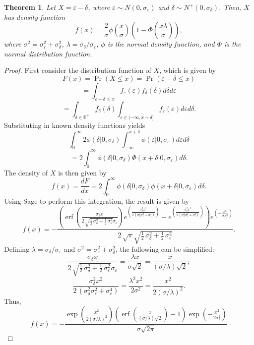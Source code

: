 \documentclass{article}
\newtheorem{theorem}{Theorem}
\newcommand{\ep}{\varepsilon}
\newcommand{\RR}{\mathbb{R}}
\begin{document}
	
\begin{theorem}
	Let $X = \ep - \delta$, where $\ep\sim N(0, \sigma_\ep)$ and $\delta\sim N^+(0, \sigma_\delta)$. Then, $X$ has density function
	$$f(x) = \frac{2}{\sigma}\phi\left(\frac{x}{\sigma}\right)\left(1 - \Phi\left(\frac{x\lambda}{\sigma}\right)\right),$$
	where $\sigma^2 = \sigma_\ep^2 + \sigma_\delta^2$, $\lambda = \sigma_\delta / \sigma_\ep$, $\phi$ is the normal density function, and $\Phi$ is the normal distribution function.
\end{theorem}
\begin{proof}
	First consider the distribution function of $X$, which is given by
	$$F(x) = \Pr(X \leq x) = \Pr(\ep - \delta \leq x)$$
	$$= \int_{\ep - \delta \leq x} f_\ep(\ep) f_\delta(\delta) d\delta d\ep$$
	$$= \int_{\delta\in\RR^+} f_\delta(\delta) \int_{\ep\in (-\infty, x + \delta]} f_\ep(\ep) d\ep d\delta.$$
	Substituting in known density functions yields
	$$\int_0^\infty 2\phi(\delta | 0, \sigma_\delta) \int_{-\infty}^{x + \delta} \phi(\ep | 0, \sigma_\ep) d\ep d\delta$$
	$$= 2\int_0^\infty \phi(\delta | 0, \sigma_\delta) \Phi(x + \delta | 0, \sigma_\ep) d\delta.$$
	The density of $X$ is then given by
	$$f(x) = \frac{dF}{dx} = 2\int_0^\infty \phi(\delta | 0, \sigma_\delta) \phi(x + \delta | 0, \sigma_\ep) d\delta.$$
	Using Sage to perform this integration, the result is given by
	$$f(x) = -\frac{{\left(\operatorname{erf}\left(\frac{\sigma_{\delta} x}{2 \, \sqrt{\frac{1}{2} \, \sigma_{\delta}^{2} + \frac{1}{2} \, \sigma_{\ep}^{2}} \sigma_{\ep}}\right) e^{\left(\frac{\sigma_{\delta}^{2} x^{2}}{2 \, {\left(\sigma_{\delta}^{2} \sigma_{\ep}^{2} + \sigma_{\ep}^{4}\right)}}\right)} - e^{\left(\frac{\sigma_{\delta}^{2} x^{2}}{2 \, {\left(\sigma_{\delta}^{2} \sigma_{\ep}^{2} + \sigma_{\ep}^{4}\right)}}\right)}\right)} e^{\left(-\frac{x^{2}}{2 \, \sigma_{\ep}^{2}}\right)}}{2 \, \sqrt{\pi} \sqrt{\frac{1}{2} \, \sigma_{\delta}^{2} + \frac{1}{2} \, \sigma_{\ep}^{2}}}.$$
	Defining $\lambda = \sigma_\delta / \sigma_\ep$ and $\sigma^2 = \sigma_\ep^2 + \sigma_\delta^2$, the following can be simplified:
	$$\frac{\sigma_{\delta} x}{2 \, \sqrt{\frac{1}{2} \, \sigma_{\delta}^{2} + \frac{1}{2} \, \sigma_{\ep}^{2}} \sigma_{\ep}} = \frac{\lambda x}{\sigma\sqrt{2}} = \frac{x}{(\sigma / \lambda) \sqrt{2}};$$
	$$\frac{\sigma_{\delta}^{2} x^{2}}{2 \, {\left(\sigma_{\delta}^{2} \sigma_{\ep}^{2} + \sigma_{\ep}^{4}\right)}} = \frac{\lambda^2 x^2}{2\sigma^2} = \frac{x^2}{2(\sigma / \lambda)^2}.$$
	Thus,
	$$f(x) = -\frac{\exp\left(\frac{x^2}{2(\sigma / \lambda)^2}\right)\left(\operatorname{erf}\left(\frac{x}{(\sigma / \lambda) \sqrt{2}}\right) - 1\right)\exp\left(-\frac{x^2}{2\sigma_\ep^2}\right)}{\sigma\sqrt{2\pi}}$$

\end{proof}
\end{document}
